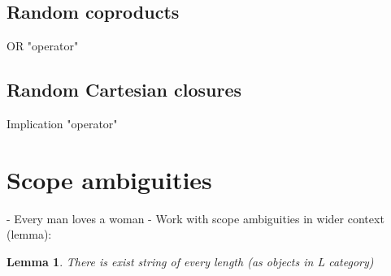 \documentclass{article}
\newtheorem{lemma}[theorem]{Lemma}
\begin{document}
\subsection{Random coproducts}
OR "operator"
\subsection{Random Cartesian closures}
Implication "operator"

\section{Scope ambiguities}
- Every man loves a woman
\newline
- Work with scope ambiguities in wider context (lemma):
\newline
\begin{lemma}
There is exist string of every length (as objects in L category)
\end{lemma}



\end{document}
